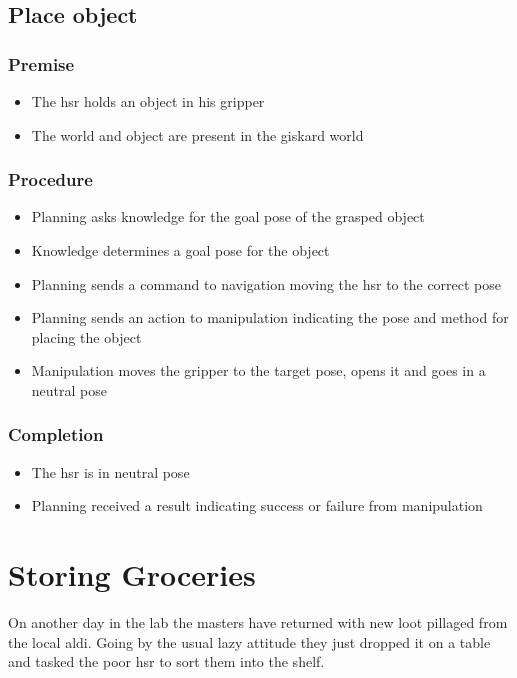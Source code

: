 \documentclass[main.tex]{subfiles}
\begin{document}
	\subsection{Place object}
	
	\subsubsection{Premise}
	\begin{itemize}
		\item The hsr holds an object in his gripper
		\item The world and object are present in the giskard world
	\end{itemize} 
	
	\subsubsection{Procedure}
	\begin{itemize}			
		\item Planning asks knowledge for the goal pose of the grasped object
		\item Knowledge determines a goal pose for the object
		\item Planning sends a command to navigation moving the hsr to the correct pose
		\item Planning sends an action to manipulation indicating the pose and method for placing the object
		\item Manipulation moves the gripper to the target pose, opens it and goes in a neutral pose 				
	\end{itemize}
	
	\subsubsection{Completion}
	\begin{itemize}
		\item The hsr is in neutral pose
		\item Planning received a result indicating success or failure from manipulation				
	\end{itemize}
	
	\section{Storing Groceries}
	On another day in the lab the masters have returned with new loot pillaged from the local aldi. Going by the usual lazy attitude they just dropped it on a table and tasked the poor hsr to sort them into the shelf. 
	
\end{document}

